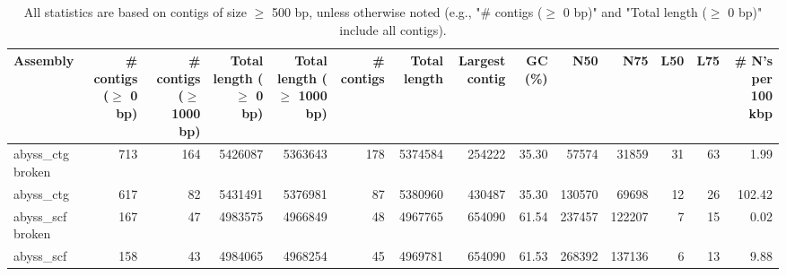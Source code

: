 \documentclass[12pt,a4paper]{article}
\begin{document}
\begin{table}[ht]
\begin{center}
\caption{All statistics are based on contigs of size $\geq$ 500 bp, unless otherwise noted (e.g., "\# contigs ($\geq$ 0 bp)" and "Total length ($\geq$ 0 bp)" include all contigs).}
\begin{tabular}{|l*{13}{|r}|}
\hline
Assembly & \# contigs ($\geq$ 0 bp) & \# contigs ($\geq$ 1000 bp) & Total length ($\geq$ 0 bp) & Total length ($\geq$ 1000 bp) & \# contigs & Total length & Largest contig & GC (\%) & N50 & N75 & L50 & L75 & \# N's per 100 kbp \\ \hline
abyss\_ctg broken & 713 & 164 & 5426087 & 5363643 & 178 & 5374584 & 254222 & 35.30 & 57574 & 31859 & 31 & 63 & 1.99 \\ \hline
abyss\_ctg & 617 & 82 & 5431491 & 5376981 & 87 & 5380960 & 430487 & 35.30 & 130570 & 69698 & 12 & 26 & 102.42 \\ \hline
abyss\_scf broken & 167 & 47 & 4983575 & 4966849 & 48 & 4967765 & 654090 & 61.54 & 237457 & 122207 & 7 & 15 & 0.02 \\ \hline
abyss\_scf & 158 & 43 & 4984065 & 4968254 & 45 & 4969781 & 654090 & 61.53 & 268392 & 137136 & 6 & 13 & 9.88 \\ \hline
\end{tabular}
\end{center}
\end{table}
\end{document}

